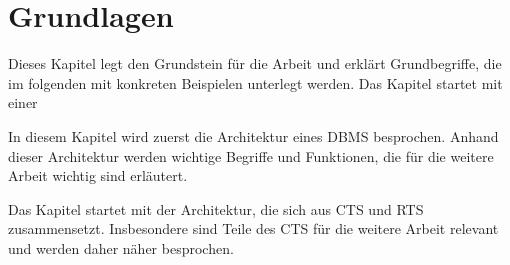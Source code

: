 \newpage
\chapter{Grundlagen}

Dieses Kapitel legt den Grundstein für die Arbeit und erklärt Grundbegriffe, die im folgenden mit konkreten Beispielen unterlegt werden. Das Kapitel startet mit einer 

In diesem Kapitel wird zuerst die Architektur eines \ac{DBMS} besprochen. Anhand dieser Architektur werden wichtige Begriffe und Funktionen, die für die weitere Arbeit wichtig sind erläutert.

Das Kapitel startet mit der Architektur, die sich aus \ac{CTS} und \ac{RTS} zusammensetzt. Insbesondere sind Teile des \ac{CTS} für die weitere Arbeit relevant und werden daher näher besprochen. 














